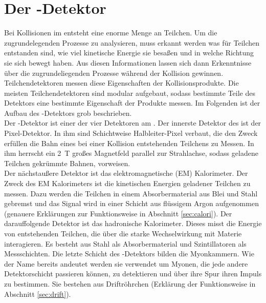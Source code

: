 \section{Der \atlas-Detektor}
Bei Kollisionen im \lhc entsteht eine enorme Menge an Teilchen. Um die zugrundelegenden Prozesse zu analysieren, muss erkannt werden was für Teilchen entstanden sind, wie viel kinetische Energie sie besaßen und in welche Richtung sie sich bewegt haben. Aus diesen Informationen lassen sich dann Erkenntnisse über die zugrundeliegenden Prozesse während der Kollision gewinnen. Teilchendetektoren messen diese Eigenschaften der Kollisionsprodukte. Die meisten Teilchendetektoren sind modular aufgebaut, sodass bestimmte Teile des Detektors eine bestimmte Eigenschaft der Produkte messen. Im Folgenden ist der Aufbau des \atlas-Detektors grob beschrieben.
\\ \noindent
Der \atlas-Detektor ist einer der vier Detektoren am \lhc. 
Der innerste Detektor des \atlas ist der Pixel-Detektor. In ihm sind Schichtweise Halbleiter-Pixel verbaut, die den Zweck erfüllen die Bahn eines bei einer Kollision entstehenden Teilchens zu Messen. In ihm herrscht ein 2~T großes Magnetfeld parallel zur Strahlachse, sodass geladene Teilchen gekrümmte Bahnen, vorweisen.
\\ \noindent
Der nächstaußere Detektor ist das elektromagnetische (EM) Kalorimeter. Der Zweck des EM Kalorimeters ist die kinetischen Energien geladener Teilchen zu messen. Dazu werden die Teilchen in einem Absorbermaterial aus Blei und Stahl gebremst und das Signal wird in einer Schicht aus flüssigem Argon aufgenommen (genauere Erklärungen zur Funktionsweise in Abschnitt \ref{sec:calori}). 
Der darauffolgende Detektor ist das hadronische Kalorimeter. Dieses misst die Energie von entstehenden Teilchen, die über die starke Wechselwirkung mit Materie interagieren. Es besteht aus Stahl als Absorbermaterial und Szintillatoren als Messschichten.
Die letzte Schicht des \atlas-Detektors bilden die Myonkammern. Wie der Name bereits andeutet werden sie verwendet um Myonen, die jede andere Detektorschicht passieren können, zu detektieren und über ihre Spur ihren Impuls zu bestimmen. Sie bestehen aus Driftröhrchen (Erklärung der Funktionsweise in Abschnitt \ref{sec:drift}).

